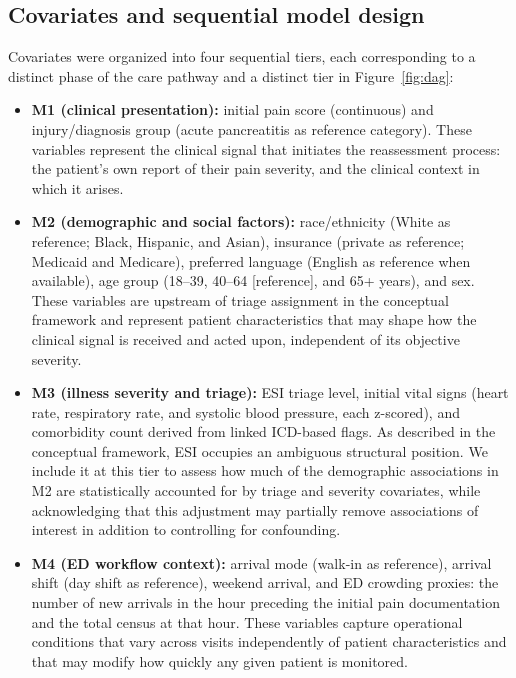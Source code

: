 \documentclass[11pt]{article}
\begin{document}
\subsection{Covariates and sequential model design}

Covariates were organized into four sequential tiers, each corresponding to a distinct phase of the care pathway and a distinct tier in Figure~\ref{fig:dag}:

\begin{itemize}
  \item \textbf{M1 (clinical presentation):} initial pain score (continuous) and injury/diagnosis group (acute pancreatitis as reference category). These variables represent the clinical signal that initiates the reassessment process: the patient's own report of their pain severity, and the clinical context in which it arises.

  \item \textbf{M2 (demographic and social factors):} race/ethnicity (White as reference; Black, Hispanic, and Asian), insurance (private as reference; Medicaid and Medicare), preferred language (English as reference when available), age group (18--39, 40--64 [reference], and 65+ years), and sex. These variables are upstream of triage assignment in the conceptual framework and represent patient characteristics that may shape how the clinical signal is received and acted upon, independent of its objective severity.

  \item \textbf{M3 (illness severity and triage):} ESI triage level, initial vital signs (heart rate, respiratory rate, and systolic blood pressure, each z-scored), and comorbidity count derived from linked ICD-based flags. As described in the conceptual framework, ESI occupies an ambiguous structural position. We include it at this tier to assess how much of the demographic associations in M2 are statistically accounted for by triage and severity covariates, while acknowledging that this adjustment may partially remove associations of interest in addition to controlling for confounding.

  \item \textbf{M4 (ED workflow context):} arrival mode (walk-in as reference), arrival shift (day shift as reference), weekend arrival, and ED crowding proxies: the number of new arrivals in the hour preceding the initial pain documentation and the total census at that hour. These variables capture operational conditions that vary across visits independently of patient characteristics and that may modify how quickly any given patient is monitored.
\end{itemize}
\end{document}
